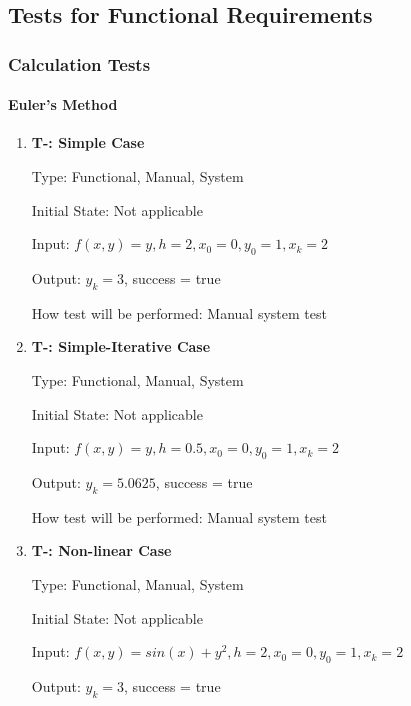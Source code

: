 \documentclass[12pt, titlepage]{article}
\newcounter{tnum} %
\begin{document}
\subsection{Tests for Functional Requirements}

\subsubsection{Calculation Tests}
		
\paragraph{Euler's Method}

\begin{enumerate}

\item{\textbf{T-\thetnum \label{t-euler_simple}: Simple Case}}

Type: Functional, Manual, System %
					
Initial State: Not applicable
					
Input: $f(x, y) = y, h = 2, x_0 = 0, y_0 = 1, x_k = 2$
					
Output: $y_k = 3$, success = true
					
How test will be performed: Manual system test

\item{\textbf{T-\thetnum \label{t-euler_simpleiterative}: Simple-Iterative Case}}

Type: Functional, Manual, System %
					
Initial State: Not applicable
					
Input: $f(x, y) = y, h = 0.5, x_0 = 0, y_0 = 1, x_k = 2$
					
Output: $y_k = 5.0625$, success = true
					
How test will be performed: Manual system test

\item{\textbf{T-\thetnum \label{t-euler_nonlinear}: Non-linear Case}}

Type: Functional, Manual, System %
					
Initial State: Not applicable
					
Input: $f(x, y) = sin(x) + y^2, h = 2, x_0 = 0, y_0 = 1, x_k = 2$
					
Output: $y_k = 3$, success = true
					

\end{enumerate}
\end{document}
